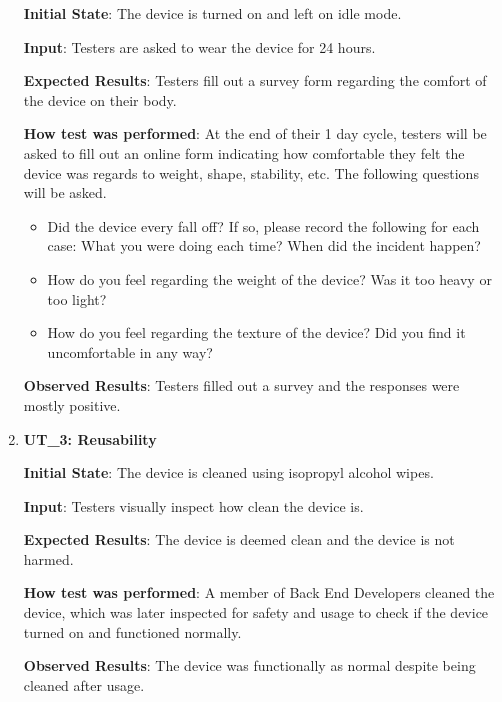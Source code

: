 \documentclass[12pt, titlepage]{article}
\begin{document}
\begin{enumerate}
  \textbf{Initial State}: The device is turned on and left on idle mode.

  \textbf{Input}: Testers are asked to wear the device for 24 hours.

  \textbf{Expected Results}: Testers fill out a survey form regarding the comfort of the device on their body.

  \textbf{How test was performed}: At the end of their 1 day cycle, testers will be asked to fill out an online form indicating how comfortable they felt the device was regards to weight, shape, stability, etc. The following questions will be asked.

  \begin{itemize}
    \item Did the device every fall off? If so, please record the following for each case: What you were doing each time? When did the incident happen?
    \item How do you feel regarding the weight of the device? Was it too heavy or too light?
    \item How do you feel regarding the texture of the device? Did you find it uncomfortable in any way?
  \end{itemize}

  \textbf{Observed Results}: Testers filled out a survey and the responses were mostly positive.

  \item\textbf{{UT\_3: Reusability\\}}\label{UT3}

  \textbf{Initial State}: The device is cleaned using isopropyl alcohol wipes.

  \textbf{Input}: Testers visually inspect how clean the device is.

  \textbf{Expected Results}: The device is deemed clean and the device is not harmed.

  \textbf{How test was performed}: A member of Back End Developers cleaned the device, which was later inspected for safety and usage to check if the device turned on and functioned normally.

  \textbf{Observed Results}: The device was functionally as normal despite being cleaned after usage.

\end{enumerate}
\end{document}
